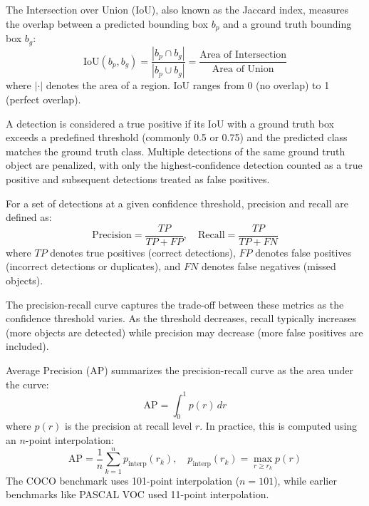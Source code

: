 \begin{definition}
\label{def:iou}
The Intersection over Union (IoU), also known as the Jaccard index, measures the overlap between a predicted bounding box $b_p$ and a ground truth bounding box $b_g$:
\begin{equation}
\text{IoU}(b_p, b_g) = \frac{|b_p \cap b_g|}{|b_p \cup b_g|} = \frac{\text{Area of Intersection}}{\text{Area of Union}}
\end{equation}
where $|{\cdot}|$ denotes the area of a region. IoU ranges from 0 (no overlap) to 1 (perfect overlap).
\end{definition}

A detection is considered a true positive if its IoU with a ground truth box exceeds a predefined threshold (commonly 0.5 or 0.75) and the predicted class matches the ground truth class. Multiple detections of the same ground truth object are penalized, with only the highest-confidence detection counted as a true positive and subsequent detections treated as false positives.

\begin{definition}
\label{def:precision_recall}
For a set of detections at a given confidence threshold, precision and recall are defined as:
\begin{equation}
\text{Precision} = \frac{TP}{TP + FP}, \quad \text{Recall} = \frac{TP}{TP + FN}
\end{equation}
where $TP$ denotes true positives (correct detections), $FP$ denotes false positives (incorrect detections or duplicates), and $FN$ denotes false negatives (missed objects).
\end{definition}

The precision-recall curve captures the trade-off between these metrics as the confidence threshold varies. As the threshold decreases, recall typically increases (more objects are detected) while precision may decrease (more false positives are included).

\begin{definition}
\label{def:ap}
Average Precision (AP) summarizes the precision-recall curve as the area under the curve:
\begin{equation}
\text{AP} = \int_0^1 p(r) \, dr
\end{equation}
where $p(r)$ is the precision at recall level $r$. In practice, this is computed using an $n$-point interpolation:
\begin{equation}
\text{AP} = \frac{1}{n} \sum_{k=1}^{n} p_{\text{interp}}(r_k), \quad p_{\text{interp}}(r_k) = \max_{r \geq r_k} p(r)
\end{equation}
The COCO benchmark uses 101-point interpolation ($n=101$), while earlier benchmarks like PASCAL VOC used 11-point interpolation.
\end{definition}

